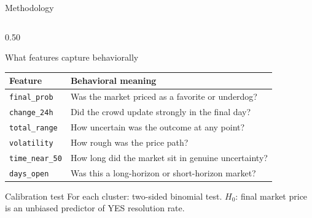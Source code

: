 \documentclass[10pt, aspectratio=169]{beamer}
\begin{document}
\begin{frame}{Methodology}
\begin{columns}[T]
    \begin{column}{0.50\textwidth}
      \begin{block}{What features capture behaviorally}
        \footnotesize
        \begin{tabular}{@{}p{2.6cm}p{3.5cm}@{}}
          \toprule
          Feature & Behavioral meaning \\
          \midrule
          \texttt{final\_prob} & Was the market priced as
                                  a favorite or underdog? \\[3pt]
          \texttt{change\_24h} & Did the crowd update strongly
                                  in the final day? \\[3pt]
          \texttt{total\_range} & How uncertain was the outcome
                                   at any point? \\[3pt]
          \texttt{volatility} & How rough was the price path? \\[3pt]
          \texttt{time\_near\_50} & How long did the market sit
                                    in genuine uncertainty? \\[3pt]
          \texttt{days\_open} & Was this a long-horizon or
                                 short-horizon market? \\
          \bottomrule
        \end{tabular}
      \end{block}

      \medskip
      \begin{block}{Calibration test}
        For each cluster: two-sided binomial test.
        $H_0$: final market price is an unbiased predictor
        of YES resolution rate.
      \end{block}
    \end{column}
  \end{columns}
\end{frame}
\end{document}
